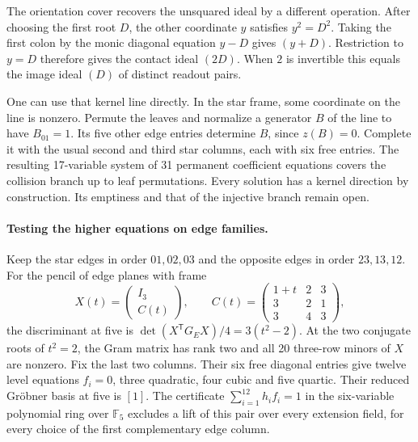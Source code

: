 The orientation cover recovers the unsquared ideal by a different
operation. After choosing the first root \(D\), the other coordinate
\(y\) satisfies \(y^2=D^2\). Taking the first colon by the monic
diagonal equation \(y-D\) gives \((y+D)\). Restriction to \(y=D\)
therefore gives the contact ideal \((2D)\). When \(2\) is invertible
this equals the image ideal \((D)\) of distinct readout pairs.

One can use that kernel line directly. In the star frame, some
coordinate on the line is nonzero. Permute the leaves and
normalize a generator \(B\) of the line to have \(B_{01}=1\).
Its five other edge entries determine \(B\), since \(z(B)=0\).
Complete it with the usual second and third star columns, each
with six free entries. The resulting 17-variable system of 31
permanent coefficient equations covers the collision branch up to
leaf permutations. Every solution has a kernel direction by
construction. Its emptiness and that of the injective branch remain open.

\paragraph{Testing the higher equations on edge families.}
Keep the star edges in order \(01,02,03\) and the opposite edges
in order \(23,13,12\). For the pencil of edge planes with frame
\[
 X(t)=\begin{pmatrix}I_3\\ C(t)\end{pmatrix},
 \qquad
 C(t)=\begin{pmatrix}1+t&2&3\\3&2&1\\3&4&3\end{pmatrix},
\]
the discriminant at five is
\(\det(X^{\mathsf T}G_E X)/4=3(t^2-2)\).
At the two conjugate roots of \(t^2=2\), the Gram matrix has rank
two and all 20 three-row minors of \(X\) are nonzero.
Fix the last two columns. Their six free diagonal entries give twelve
level equations \(f_i=0\), three quadratic, four cubic and five quartic.
Their reduced Gr\"obner basis at five is \([1]\). The certificate
\(\sum_{i=1}^{12}h_i f_i=1\) in the six-variable polynomial ring
over \(\mathbb F_5\) excludes a lift of this pair over every extension
field, for every choice of the first complementary edge column.

